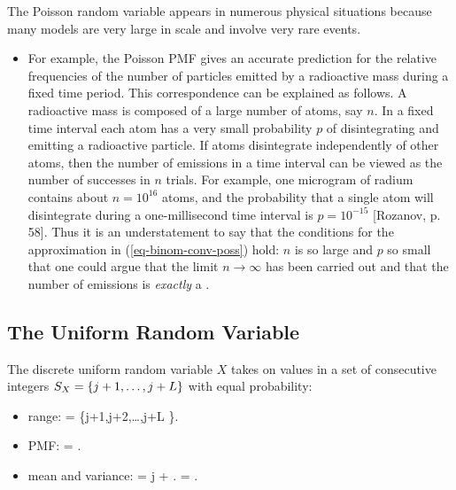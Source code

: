 	\item
	The Poisson random variable appears
	in numerous physical situations
	because many models are very large in scale and involve very rare events.
	\begin{itemize}
		\item
		For example,
		the Poisson PMF gives an accurate prediction
		for the relative frequencies of the number of particles emitted
		by a radioactive mass during a fixed time period.
		This correspondence can be explained as follows.
		A radioactive mass is composed of a large number of atoms,
		say $n$.
		In a fixed time interval each atom has a very small probability $p$
		of disintegrating and emitting a radioactive particle.
		If atoms disintegrate independently of other atoms,
		then the number of emissions in a time interval
		can be viewed as the number of successes in $n$ trials.
		For example, one microgram of radium contains about $n = 10^{16}$ atoms,
		and the probability that a single atom will disintegrate
		during a one-millisecond time interval is $p = 10^{-15}$ [Rozanov, p. 58]. 
		Thus it is an understatement to say that the conditions
		for the approximation in (\ref{eq-binom-conv-poss}) hold:
		$n$ is so large and $p$ so small that one could argue
		that the limit $n \to \infty$ has been carried out
		and that the number of emissions is \emph{exactly}
		a \possrv.
	\end{itemize}
	
\eit

\subsection{The Uniform Random Variable}

\bit
	\item
	The discrete uniform random variable $X$ takes on values
	in a set of consecutive integers $S_X = \{j + 1, \ldots, j + L\}$
	with equal probability:
	\begin{itemize}
		\item range:
			\ssx = \{j+1,j+2,\ldots,j+L \}.
		\eeql
		\item PMF:
			 = .
		\eeql

		\item mean and variance:
			 = j + .
		\eeql
			 = .
		\eeql
	\end{itemize}


